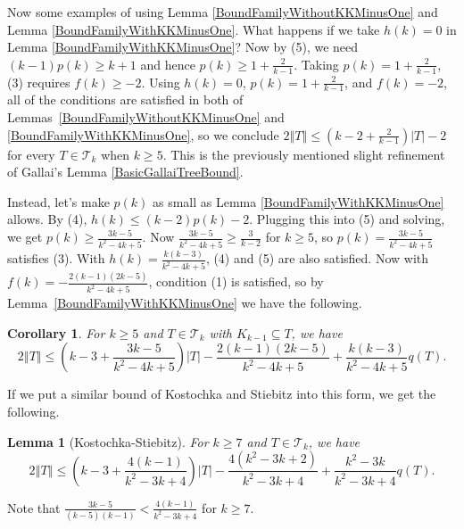 \documentclass[12pt]{article}
\theoremstyle{plain}
\newtheorem{lem}[thm]{Lemma}
\newtheorem{cor}[thm]{Corollary}
\theoremstyle{definition}
\theoremstyle{remark}
\newcommand{\fancy}[1]{\mathcal{#1}}
\newcommand{\T}{\fancy{T}}
\newcommand{\card}[1]{\left|#1\right|}
\newcommand{\size}[1]{\left\Vert#1\right\Vert}
\newcommand{\parens}[1]{\left( #1 \right)}
\begin{document}
Now some examples of using Lemma \ref{BoundFamilyWithoutKKMinusOne} and Lemma \ref{BoundFamilyWithKKMinusOne}.  What happens if we take $h(k) = 0$ in Lemma \ref{BoundFamilyWithKKMinusOne}?  Now by (5), we need $(k-1)p(k) \ge k + 1$ and hence $p(k) \ge 1 + \frac{2}{k-1}$.  Taking $p(k) = 1 + \frac{2}{k-1}$, (3) requires $f(k) \ge -2$.  Using $h(k)=0$, $p(k)=1+\frac2{k-1}$, and $f(k) = -2$, all of the conditions are satisfied in both of Lemmas~\ref{BoundFamilyWithoutKKMinusOne} and \ref{BoundFamilyWithKKMinusOne}, so we conclude $2\size{T} \le \parens{k-2 + \frac{2}{k-1}}\card{T} - 2$ for every $T \in \T_k$ when $k \ge 5$.  This is the previously mentioned slight refinement of Gallai's Lemma \ref{BasicGallaiTreeBound}.

Instead, let's make $p(k)$ as small as Lemma \ref{BoundFamilyWithKKMinusOne} allows. By (4), $h(k) \le (k-2)p(k) - 2$. Plugging 
this into (5) and solving, we get $p(k) \ge \frac{3k-5}{k^2 - 4k + 5}$.  Now $\frac{3k-5}{k^2 - 4k + 5} \ge \frac{3}{k-2}$ 
for $k \ge 5$, so $p(k) = \frac{3k-5}{k^2 - 4k + 5}$ satisfies (3).  With $h(k) = \frac{k(k-3)}{k^2 - 4k + 5}$, (4) and (5) 
are also satisfied. Now with $f(k) = -\frac{2(k-1)(2k-5)}{k^2 - 4k + 5}$, condition (1) is satisfied, so by 
Lemma~\ref{BoundFamilyWithKKMinusOne} we have the following.

\begin{cor}\label{SmallP}
	For $k \ge 5$ and $T \in \T_k$ with $K_{k-1} \subseteq T$, we have
	\[2\size{T} \le \parens{k-3 + \frac{3k-5}{k^2 - 4k + 5}}\card{T} - \frac{2(k-1)(2k-5)}{k^2 - 4k + 5} + 
	\frac{k(k-3)}{k^2 - 4k + 5}q(T).\]
\end{cor}

If we put a similar bound of Kostochka and Stiebitz into this form, we get the following.
\begin{lem}[Kostochka-Stiebitz]
		For $k \ge 7$ and $T \in \T_k$, we have
		\[2\size{T} \le \parens{k-3 + \frac{4(k-1)}{k^2 - 3k + 4}}\card{T} - \frac{4(k^2-3k+2)}{k^2-3k+4} + 
		\frac{k^2 - 3k}{k^2-3k+4}q(T).\]
\end{lem}
\noindent
Note that $\frac{3k-5}{(k-5)(k-1)} < \frac{4(k-1)}{k^2 - 3k + 4}$ for $k \ge 7$.
\end{document}
